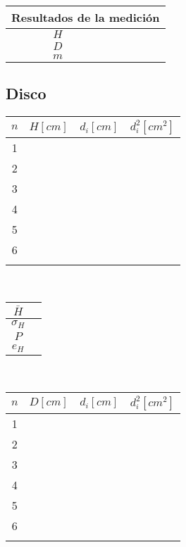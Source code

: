 \documentclass[letter,twoside,11pt]{article}
\begin{document}
\vspace{1.4cm}
\begin{tabular}{|c|p{2.0cm}|}
\hline
\multicolumn{2}{|c|}{Resultados de la medición} \\ \hline
$H$ & \\ \hline
$D$ & \\ \hline
$m$ & \\ \hline
\end{tabular}

\subsection{Disco}
\begin{tabular}{|c|>{\centering}m{2.0cm}<{\centering}
                  |>{\centering}m{2.0cm}<{\centering}
                  |>{\centering}m{2.0cm}<{\centering}|}
\hline
\textbf{$n$} & \textbf{$H[cm]$}
             & \textbf{$d_i[cm]$}
             & \textbf{$d_i^2[cm^2]$} \tabularnewline \hline
1 & & & \\ \hline
2 & & & \\ \hline
3 & & & \\ \hline
4 & & & \\ \hline
5 & & & \\ \hline
6 & & & \\ \hline
 & & & \\ \hline
\end{tabular}\\

\vspace{0.5cm}
\begin{tabular}{|c|p{2.0cm}|}
\hline
$\bar{H}$ & \\ \hline
$\sigma_H$ & \\ \hline
$P$ & \\ \hline
$e_H$ & \\ \hline
\end{tabular}\\

\begin{tabular}{|c|>{\centering}m{2.0cm}<{\centering}
                  |>{\centering}m{2.0cm}<{\centering}
                  |>{\centering}m{2.0cm}<{\centering}|}
\hline
\textbf{$n$} & \textbf{$D[cm]$}
             & \textbf{$d_i[cm]$}
             & \textbf{$d_i^2[cm^2]$} \tabularnewline \hline
1 & & & \\ \hline
2 & & & \\ \hline
3 & & & \\ \hline
4 & & & \\ \hline
5 & & & \\ \hline
6 & & & \\ \hline
 & & & \\ \hline
\end{tabular}\\
\end{document}
